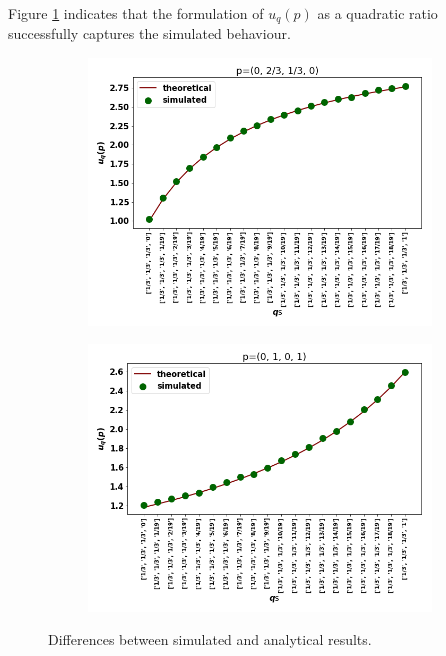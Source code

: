\documentclass[10pt]{article}
\begin{document}
Figure \ref{fig:analytical_simulated} indicates that the  formulation of \(u_q(p)\)
as a quadratic ratio successfully captures the simulated behaviour.

\begin{figure}[!htbp]
\begin{center}
    \begin{subfigure}{0.45\textwidth}
        \includegraphics[width=\linewidth]{img/validation_img_two.png}
    \end{subfigure}
    \begin{subfigure}{0.45\textwidth}
        \includegraphics[width=\linewidth]{img/validation_img_three.png}
    \end{subfigure}
\end{center}
\caption{Differences between simulated and analytical results.}
\label{fig:analytical_simulated}
\end{figure}
\end{document}
